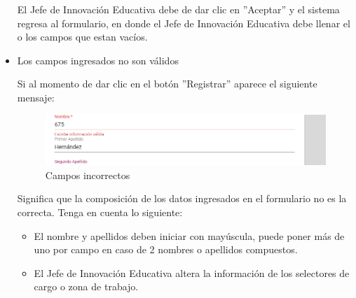 \begin{itemize}
                         El Jefe de Innovación Educativa debe de dar clic en ''Aceptar'' y el sistema regresa al formulario, en donde el Jefe de Innovación Educativa debe llenar el o los campos que estan vacíos.

                    \item Los campos ingresados no son válidos

                        Si al momento de dar clic en el botón ''Registrar'' aparece el siguiente mensaje:
                         \begin{figure}[H]
                            \centering
                            \includegraphics[width=0.4\linewidth]{images/SP1/MSG35}
                            \caption{Campos incorrectos}
                            \label{mensaje35}

                        \end{figure}

                        Significa que la composición de los datos ingresados en el formulario no es la correcta. Tenga en cuenta lo siguiente:

                        \begin{itemize}
                            \item El nombre y apellidos deben iniciar con mayúscula, puede poner más de uno por campo en caso de 2 nombres o apellidos compuestos.
                            \item El Jefe de Innovación Educativa altera la información de los selectores de cargo o zona de trabajo.
                        \end{itemize}

                \end{itemize}

\newpage

            \hypertarget{editar-RH}{}
